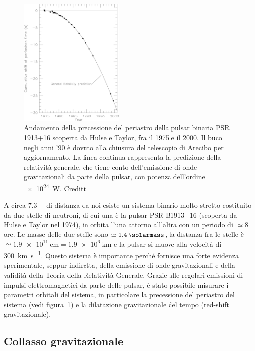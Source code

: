 \begin{figure}
  \centering
  \includegraphics[width=0.45\textwidth]{figure/hulse-taylor-grav-wave}
  \caption{Andamento della precessione del periastro della pulsar binaria PSR
    1913+16 scoperta da Hulse e Taylor, fra il 1975 e il 2000.  Il buco negli
    anni '90 è dovuto alla chiusura del telescopio di Arecibo per aggiornamento.
    La linea continua rappresenta la predizione della relatività generale, che
    tiene conto dell'emissione di onde gravitazionali da parte della pulsar, con
    potenza dell'ordine \SI{e24}{\watt}.  Crediti:
    \textcite{2001LRR.....4....4W}}
  \label{fig:hulse-taylor-grav-wave}
\end{figure}
A circa \SI{7.3}{\kilo\parsec} di distanza da noi esiste un sistema binario
molto stretto costituito da due stelle di neutroni, di cui una è la pulsar PSR
B1913+16 (scoperta da Hulse e Taylor nel 1974), in orbita l'una attorno
all'altra con un periodo di $\simeq 8$ ore.  Le masse delle due stelle sono
$\simeq \SI{1.4}{\solarmass}$, la distanza fra le stelle è
$\simeq \SI{1.9e11}{\centi\metre} = \SI{1.9e6}{\kilo\metre}$ e la pulsar si
muove alla velocità di \SI{300}{\kilo\metre\per\second}.  Questo sistema è
importante perché fornisce una forte evidenza sperimentale, seppur indiretta,
della emissione di onde gravitazionali e della validità della Teoria della
Relatività Generale.  Grazie alle regolari emissioni di impulsi elettromagnetici
da parte delle pulsar, è stato possibile misurare i parametri orbitali del
sistema, in particolare la precessione del periastro del sistema (vedi
figura~\ref{fig:hulse-taylor-grav-wave}) e la dilatazione gravitazionale del
tempo (red-shift gravitazionale).

\subsection{Collasso gravitazionale}
\label{sec:collasso-grav}

